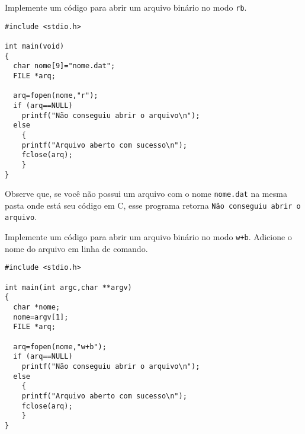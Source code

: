 \begin{ex}
Implemente um código para abrir um arquivo binário no modo \verb|rb|.
\end{ex}
\begin{verbatim}
#include <stdio.h>

int main(void)
{
  char nome[9]="nome.dat";
  FILE *arq;
 
  arq=fopen(nome,"r");
  if (arq==NULL) 
    printf("Não conseguiu abrir o arquivo\n");
  else 
    {
    printf("Arquivo aberto com sucesso\n");
    fclose(arq);
    }
}
\end{verbatim}
Observe que, se você não possui um arquivo com o nome \verb|nome.dat| na mesma pasta onde está seu código em C, esse programa retorna \verb|Não conseguiu abrir o arquivo|.

\begin{ex}
Implemente um código para abrir um arquivo binário no modo \verb|w+b|. Adicione o nome do arquivo em linha de comando.
\end{ex}
\begin{verbatim}
#include <stdio.h>

int main(int argc,char **argv)
{
  char *nome;
  nome=argv[1];
  FILE *arq;
 
  arq=fopen(nome,"w+b");
  if (arq==NULL) 
    printf("Não conseguiu abrir o arquivo\n");
  else 
    {
    printf("Arquivo aberto com sucesso\n");
    fclose(arq);
    }
}
\end{verbatim}
